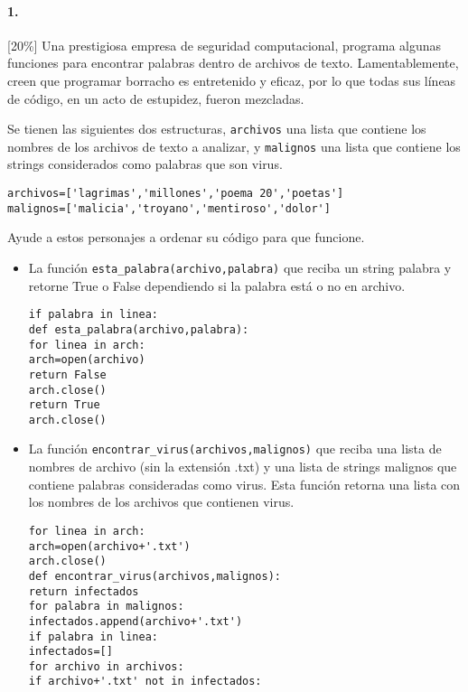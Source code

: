 \paragraph{1.} 
[20\%] Una prestigiosa empresa de seguridad computacional, programa algunas funciones para encontrar palabras
dentro de archivos de texto. Lamentablemente, creen que programar borracho es entretenido y eficaz,
por lo que todas sus líneas de código, en un acto de estupidez, fueron mezcladas.

Se tienen las siguientes dos estructuras, \texttt{archivos} una lista que contiene los nombres de los archivos de texto a analizar, y \texttt{malignos} una lista que contiene los strings considerados como palabras que son virus.
\begin{lstlisting}[style=consola]
archivos=['lagrimas','millones','poema 20','poetas']
malignos=['malicia','troyano','mentiroso','dolor']
\end{lstlisting}
Ayude a estos personajes a ordenar su código para que funcione.
\begin{itemize}
    \item La función \texttt{esta\_palabra(archivo,palabra)} que reciba un string palabra y retorne True o False dependiendo si la palabra está o no en archivo.
    
    \begin{lstlisting}[style=consola]
if palabra in linea:
def esta_palabra(archivo,palabra):
for linea in arch:
arch=open(archivo)
return False
arch.close()
return True
arch.close()
    \end{lstlisting}
    
    \item La función \texttt{encontrar\_virus(archivos,malignos)} que reciba una lista de nombres de archivo (sin la extensión .txt) y una lista de strings malignos que contiene palabras consideradas como virus. Esta función retorna una lista con los nombres de los archivos que contienen virus.
    
\begin{lstlisting}[style=consola]
for linea in arch:
arch=open(archivo+'.txt')
arch.close()
def encontrar_virus(archivos,malignos):
return infectados
for palabra in malignos:
infectados.append(archivo+'.txt')
if palabra in linea:
infectados=[]
for archivo in archivos:
if archivo+'.txt' not in infectados:
\end{lstlisting}
\end{itemize}




